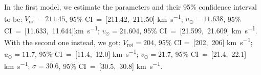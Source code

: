 In the first model, we estimate the parameters and their 95\% confidence interval to be: %
$V_{\text{rot}} = 211.45$, 95\% CI~=~[211.42,~211.50] \unit{\kilo\meter\per\second}; 
$u_{\odot} = 11.638$, 95\% CI~=~[11.633,~11.644]\unit{\kilo\meter\per\second}; 
$v_{\odot} = 21.604$, 95\% CI~=~[21.599,~21.609] \unit{\kilo\meter\per\second}. 
With the second one instead, we got: 
$V_{\text{rot}}= 204$, 95\% CI =~[202,~206] \unit{\kilo\meter\per\second}; 
$u_{\odot} = 11.7$, 95\% CI~=~[11.4,~12.0] \unit{\kilo\meter\per\second}; 
$v_{\odot} = 21.7$, 95\% CI~=~[21.4,~22.1] \unit{\kilo\meter\per\second}; 
$\sigma = 30.6$, 95\% CI~=~[30.5,~30.8] \unit{\kilo\meter\per\second}.